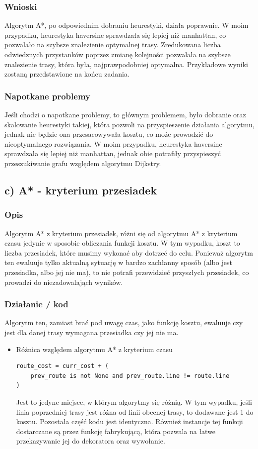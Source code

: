 \documentclass[a4paper, 12pt]{article}
\begin{document}
  \subsubsection{Wnioski}
  Algorytm A*, po odpowiednim dobraniu heurestyki, działa poprawnie.
  W moim przypadku, heurestyka haversine sprawdzała się lepiej niż manhattan, co pozwalało na szybsze
  znalezienie optymalnej trasy. Zredukowana liczba odwiedznych przystanków poprzez
  zmianę kolejności pozwalała na szybsze znalezienie trasy, która była, najprawpodobniej optymalna.
  Przykładowe wyniki zostaną przedstawione na końcu zadania.

  \subsubsection{Napotkane problemy}
  Jeśli chodzi o napotkane problemy, to głównym problemem, było dobranie 
  oraz skalowanie heurestyki takiej,
  która pozwoli na przyspieszenie działania algorytmu, jednak nie będzie ona przesacowywała
  kosztu, co może prowadzić do nieoptymalnego rozwiązania. W moim przypadku, heurestyka haversine
  sprawdzała się lepiej niż manhattan, jednak obie potrafiły przyspieszyć przeszukiwanie grafu 
  względem algorytmu Dijkstry.


  \subsection{c) A* - kryterium przesiadek}

  \subsubsection{Opis}
  Algorytm A* z kryterium przesiadek, różni się od algorytmu A* z kryterium czasu jedynie w sposobie
  obliczania funkcji kosztu. W tym wypadku, koszt to liczba przesiadek, które musimy wykonać
  aby dotrzeć do celu. Ponieważ algorytm ten ewaluuje tylko aktualną sytuację 
  w bardzo zachłanny sposób (albo jest przesiadka, albo jej nie ma), to 
  nie potrafi przewidzieć przyszłych przesiadek, co prowadzi do niezadowalająch wyników.

  \subsubsection{Działanie / kod}
  Algorytm ten, zamiast brać pod uwagę czas, jako funkcję kosztu, ewaluuje 
  czy jest dla danej trasy wymagana przesiadka czy jej nie ma.
  \begin{itemize}
    \item Różnica względem algorytmu A* z kryterium czasu
\begin{lstlisting}
route_cost = curr_cost + (
    prev_route is not None and prev_route.line != route.line
)
\end{lstlisting}
  Jest to jedyne miejsce, w którym algorytmy się różnią. W tym wypadku, jeśli linia
  poprzedniej trasy jest różna od linii obecnej trasy, to dodawane jest 1 do kosztu.
  Pozostała część kodu jest identyczna. Również instancje tej funkcji dostarczane są przez 
  funkcję fabrykującą, która pozwala na łatwe przekazywanie jej do dekoratora oraz wywołanie.
  \end{itemize}
\end{document}
